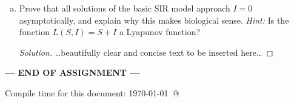 \documentclass[12pt]{article}
\begin{document}
\begin{enumerate}[(a)]
\begin{enumerate}[(i)]
{\begin{proof}[Solution]
{}
\end{proof}
}

\end{enumerate}

\item Prove that all solutions of the basic SIR model approach $I=0$ asymptotically, and explain why this makes biological sense.  \emph{Hint:} Is the function $L(S,I)=S+I$ a Lyapunov function?

{\color{blue}
\begin{proof}[Solution]
{\color{magenta}\dots beautifully clear and concise text to be inserted here\dots}
\end{proof}
}

\end{enumerate}


\bigskip

\centerline{\bf--- END OF ASSIGNMENT ---}

\bigskip
Compile time for this document:
\today\ @ \thistime
\end{document}
